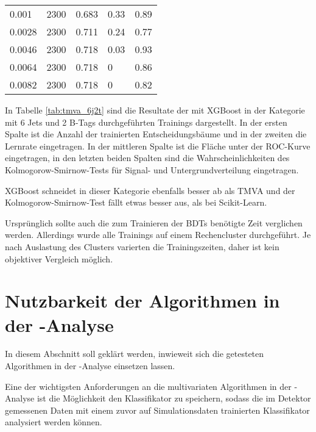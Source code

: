 \begin{table}[tbp]
\begin{center}
\begin{tabular}{lllll}
\num{0,001}  & \num{2300} & \num{0,683} & \num{0,33} & \num{0,89}\\
\num{0,0028} & \num{2300} & \num{0,711} & \num{0,24} & \num{0,77}\\
\num{0,0046} & \num{2300} & \num{0,718} & \num{0,03} & \num{0,93}\\
\num{0,0064} & \num{2300} & \num{0,718} & \num{0}    & \num{0,86}\\
\num{0,0082} & \num{2300} & \num{0,718} & \num{0}    & \num{0,82}\\
  \hline
  \end{tabular}
  \end{center}
\end{table}

In Tabelle \ref{tab:tmva_6j2t} sind die Resultate der mit XGBoost in der Kategorie mit 6 Jets und 2 B-Tags  durchgef\"uhrten Trainings dargestellt. In der ersten Spalte ist die Anzahl der trainierten Entscheidungsb\"aume und in der zweiten die Lernrate eingetragen. In der mittleren Spalte ist die Fl\"ache unter der ROC-Kurve eingetragen, in den letzten beiden Spalten sind die Wahrscheinlichkeiten des Kolmogorow-Smirnow-Tests f\"ur Signal- und Untergrundverteilung eingetragen.

XGBoost schneidet in dieser Kategorie ebenfalls besser ab als TMVA und der Kolmogorow-Smirnow-Test f\"allt etwas besser aus, als bei Scikit-Learn.

Urspr\"unglich sollte auch die zum Trainieren der BDTs ben\"otigte Zeit verglichen werden. Allerdings wurde alle Trainings auf einem Rechencluster durchgef\"uhrt. Je nach Auslastung des Clusters varierten die Trainingszeiten, daher ist kein objektiver Vergleich m\"oglich.

\section{Nutzbarkeit der Algorithmen in der \ttH-Analyse}
\label{ch:Vergleich:sec:ttH}

In diesem Abschnitt soll gekl\"art werden, inwieweit sich die getesteten Algorithmen in der \ttH-Analyse einsetzen lassen.

Eine der wichtigsten Anforderungen an die multivariaten Algorithmen in der \ttH-Analyse ist die M\"oglichkeit den Klassifikator zu speichern, sodass die im Detektor gemessenen Daten mit einem zuvor auf Simulationsdaten trainierten Klassifikator analysiert werden k\"onnen.

